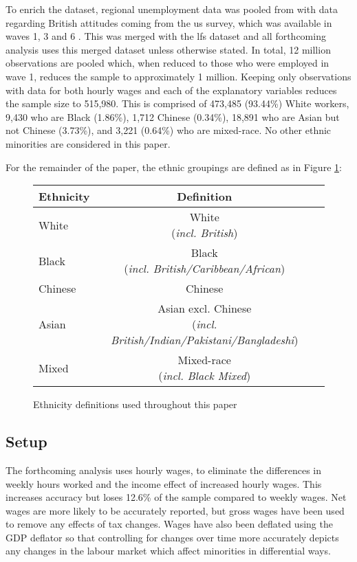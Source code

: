 \documentclass[class=article, crop=false]{standalone}
\begin{document}
To enrich the dataset, regional unemployment data was pooled from \citet{ONSf} with data regarding British attitudes coming from the \acrfull{us} survey, which was available in waves 1, 3 and 6 \citep{US}. This was merged with the \acrshort{lfs} dataset and all forthcoming analysis uses this merged dataset unless otherwise stated. In total, 12 million observations are pooled which, when reduced to those who were employed in wave 1, reduces the sample to approximately 1 million. Keeping only observations with data for both hourly wages and each of the explanatory variables reduces the sample size to 515,980. This is comprised of 473,485 (93.44\%) White workers, 9,430 who are Black (1.86\%), 1,712 Chinese (0.34\%), 18,891 who are  Asian but not Chinese (3.73\%), and 3,221 (0.64\%) who are mixed-race. No other ethnic minorities are considered in this paper.

For the remainder of the paper, the ethnic groupings are defined as in Figure \ref{fig:ethnicity_definitions}:
\begin{figure}[h!]
    \begin{center}
        \begin{tabular}{l*{2}{c}}
            \hline\hline
            \textbf{Ethnicity} & \textbf{Definition} \\
            \hline
            White & \makecell{White \\(\textit{incl. British})} \\
            Black & \makecell{Black \\(\textit{incl. British/Caribbean/African})} \\
            Chinese & Chinese \\
            Asian & \makecell{Asian excl. Chinese \\(\textit{incl. British/Indian/Pakistani/Bangladeshi})} \\
            Mixed & \makecell{Mixed-race \\(\textit{incl. Black Mixed})} \\
            \hline\hline
        \end{tabular}
    \end{center}
    \caption{Ethnicity definitions used throughout this paper}
    \label{fig:ethnicity_definitions}
\end{figure}

\subsection{Setup}
\label{sec:Setup}
The forthcoming analysis uses hourly wages, to eliminate the differences in weekly hours worked and the income effect of increased hourly wages. This increases accuracy but loses 12.6\% of the sample compared to weekly wages. Net wages are more likely to be accurately reported, but gross wages have been used to remove any effects of tax changes. Wages have also been deflated using the GDP deflator \citep{ONSh} so that controlling for changes over time more accurately depicts any changes in the labour market which affect minorities in differential ways. 
\end{document}
